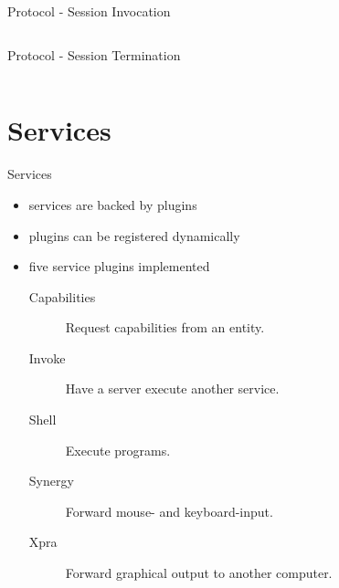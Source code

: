 \documentclass[a4paper]{beamer}
\begin{document}
\begin{frame}{Protocol - Session Invocation}
    \begin{columns}[t]
        \begin{column}{0.45\textwidth}
            
        \end{column}
        \begin{column}{0.45\textwidth}
            
        \end{column}
    \end{columns}
\end{frame}

\begin{frame}{Protocol - Session Termination}
    \begin{columns}[t]
        \begin{column}{0.45\textwidth}
            
        \end{column}
        \begin{column}{0.45\textwidth}
        \end{column}
    \end{columns}
\end{frame}

\section{Services}

\begin{frame}{Services}
    \begin{itemize}
        \item services are backed by plugins
        \item plugins can be registered dynamically
        \item five service plugins implemented
            \begin{description}
                \item[Capabilities] Request capabilities from an entity.
                \item[Invoke] Have a server execute another service.
                \item[Shell] Execute programs.
                \item[Synergy] Forward mouse- and keyboard-input.
                \item[Xpra] Forward graphical output to another computer.
            \end{description}
    \end{itemize}
\end{frame}
\end{document}
